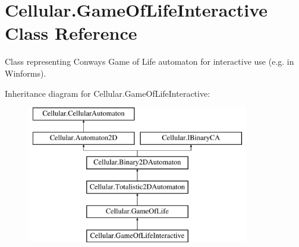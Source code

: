 \hypertarget{class_cellular_1_1_game_of_life_interactive}{}\section{Cellular.\+Game\+Of\+Life\+Interactive Class Reference}
\label{class_cellular_1_1_game_of_life_interactive}


Class representing Conway\textquotesingle{}s Game of Life automaton for interactive use (e.\+g. in Winforms).  


Inheritance diagram for Cellular.\+Game\+Of\+Life\+Interactive\+:\begin{figure}[H]
\begin{center}
\leavevmode
\includegraphics[height=6.000000cm]{class_cellular_1_1_game_of_life_interactive}
\end{center}
\end{figure}
